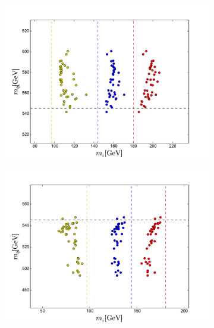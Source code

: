 \documentclass[twoside,english]{uiofysmaster}
\begin{document}
\begin{figure}[hbt]
	\centering
	\begin{subfigure}[b]{0.49\textwidth}
		\includegraphics[width=\textwidth]{figures/comphep_scipy_TNC_fit_1p1_initial_guess.pdf} 
		\caption{}
		\label{fig:comphep_scipy_TNC_fits1}
	\end{subfigure}
	\begin{subfigure}[b]{0.49\textwidth}
		\includegraphics[width=\textwidth]{figures/comphep_scipy_TNC_fit_0p9_initial_guess.pdf} 
		\caption{}
		\label{fig:comphep_scipy_TNC_fits2}
	\end{subfigure}


\end{figure}
\end{document}
